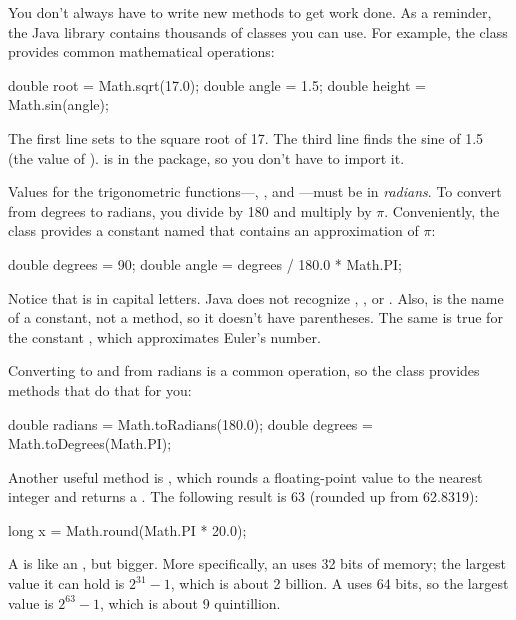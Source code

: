 
You don't always have to write new methods to get work done.
As a reminder, the Java library contains thousands of classes you can use.
For example, the  class provides common mathematical operations:

\begin{code}
double root = Math.sqrt(17.0);
double angle = 1.5;
double height = Math.sin(angle);
\end{code}

The first line sets  to the square root of 17.
The third line finds the sine of 1.5 (the value of ).
 is in the  package, so you don't have to import it.


Values for the trigonometric functions---, , and ---must be in {\em radians}.
To convert from degrees to radians, you divide by 180 and multiply by $\pi$.
Conveniently, the  class provides a constant named  that contains an approximation of $\pi$:

\begin{code}
double degrees = 90;
double angle = degrees / 180.0 * Math.PI;
\end{code}

Notice that  is in capital letters.
Java does not recognize , , or .
Also,  is the name of a constant, not a method, so it doesn't have parentheses.
The same is true for the constant , which approximates Euler's number.

Converting to and from radians is a common operation, so the  class provides methods that do that for you:

\begin{code}
double radians = Math.toRadians(180.0);
double degrees = Math.toDegrees(Math.PI);
\end{code}


Another useful method is , which rounds a floating-point value to the nearest integer and returns a .
The following result is 63 (rounded up from 62.8319):

\begin{code}
long x = Math.round(Math.PI * 20.0);
\end{code}

A  is like an , but bigger.
More specifically, an  uses 32 bits of memory; the largest value it can hold is $2^{31}-1$, which is about 2 billion.
A  uses 64 bits, so the largest value is $2^{63}-1$, which is about 9 quintillion.

